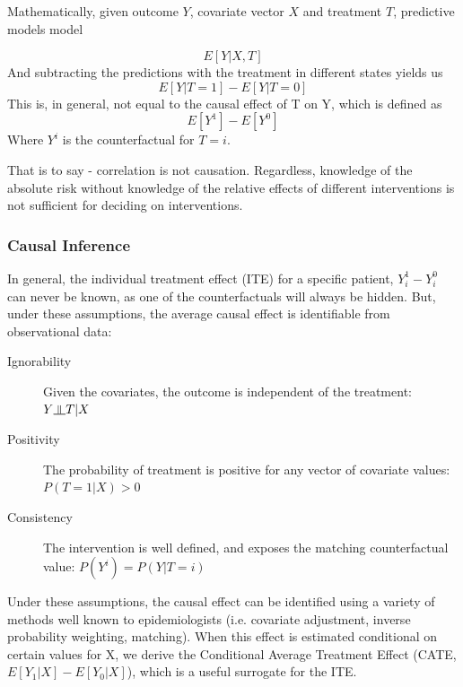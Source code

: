 \documentclass[a4paper,12pt]{article}
\newcommand{\indep}{\rotatebox[origin=c]{90}{$\models$}}
\begin{document}
			Mathematically, given outcome $ Y $, covariate vector $ X $ and treatment $ T $, predictive models model
			
			\begin{equation*}
			E[Y|X,T]
			\end{equation*}
			And subtracting the predictions with the treatment in different states yields us
			\begin{equation*}
			E[Y|T=1] - E[Y|T=0]
			\end{equation*}
			This is, in general, not equal to the causal effect of T on Y, which is defined as
			\begin{equation*}
			E[Y^1] - E[Y^0]
			\end{equation*}
			Where $ Y^i $ is the counterfactual for $ T=i $.
			
			That is to say - correlation is not causation. Regardless, knowledge of the absolute risk without knowledge of the relative effects of different interventions is not sufficient for deciding on interventions.
			
			\subsubsection{Causal Inference}
			In general, the individual treatment effect (ITE) for a specific patient, $ Y_i^1 - Y_i^0 $ can never be known, as one of the counterfactuals will always be hidden. But, under these assumptions, the average causal effect is identifiable from observational data:
			\begin{description}
				\item[Ignorability] Given the covariates, the outcome is independent of the treatment: $ Y \indep  T | X$
				\item[Positivity] The probability of treatment is positive for any vector of covariate values: $ P(T = 1|X) > 0 $
				\item[Consistency] The intervention is well defined, and exposes the matching counterfactual value: $ P(Y^i) = P(Y|T=i) $
			\end{description}
		
			Under these assumptions, the causal effect can be identified using a variety of methods well known to epidemiologists (i.e. covariate adjustment, inverse probability weighting, matching). When this effect is estimated conditional on certain values for X, we derive the Conditional Average Treatment Effect (CATE, $ E[Y_1|X] - E[Y_0|X] $), which is a useful surrogate for the ITE.
			
\end{document}
